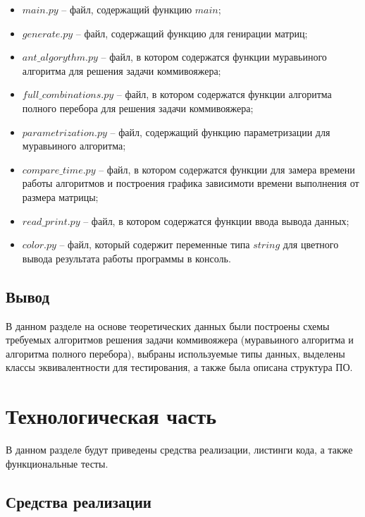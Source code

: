 \documentclass[a4paper,14pt, unknownkeysallowed]{extreport}
\begin{document}
\begin{itemize}
	\item $main.py$ -- файл, содержащий функцию $main$;
	\item $generate.py$ -- файл, содержащий функцию для генирации матриц;
    \item $ant\_algorythm.py$ -- файл, в котором содержатся функции муравьиного алгоритма для решения задачи коммивояжера;
    \item $full\_combinations.py$ -- файл, в котором содержатся функции алгоритма полного перебора для решения задачи коммивояжера;
    \item $parametrization.py$ -- файл, содержащий функцию параметризации для муравьиного алгоритма;
    \item $compare\_time.py$ -- файл, в котором содержатся функции для замера времени работы алгоритмов и построения графика зависимоти времени выполнения от размера матрицы;
    \item $read\_print.py$ -- файл, в котором содержатся функции ввода вывода данных;
    \item $color.py$ -- файл, который содержит переменные типа $string$ для цветного вывода результата работы программы в консоль.
\end{itemize}

\section{Вывод}

В данном разделе на основе теоретических данных были построены схемы требуемых алгоритмов решения задачи коммивояжера (муравьиного алгоритма и алгоритма полного перебора), выбраны используемые типы данных, выделены классы эквивалентности для тестирования, а также была описана структура ПО.

\clearpage





\chapter{Технологическая часть}

В данном разделе будут приведены средства реализации, листинги кода, а также функциональные тесты.


\section{Средства реализации}
\end{document}

